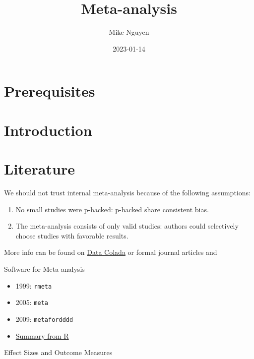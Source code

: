 \documentclass[
]{book}
\title{Meta-analysis}
\author{Mike Nguyen}
\date{2023-01-14}
\providecommand{\tightlist}{%
  \setlength{\itemsep}{0pt}\setlength{\parskip}{0pt}}
\begin{document}
\maketitle

{
\setcounter{tocdepth}{1}
\tableofcontents
}
\hypertarget{prerequisites}{%
\chapter{Prerequisites}\label{prerequisites}}

\hypertarget{intro}{%
\chapter{Introduction}\label{intro}}

\hypertarget{literature}{%
\chapter{Literature}\label{literature}}

We should not trust internal meta-analysis because of the following assumptions:

\begin{enumerate}
\def\labelenumi{\arabic{enumi}.}
\tightlist
\item
  No small studies were p-hacked: p-hacked share consistent bias.
\item
  The meta-analysis consists of only valid studies: authors could selectively choose studies with favorable results.
\end{enumerate}

More info can be found on \href{https://datacolada.org/73}{Data Colada} or formal journal articles \citep{Vosgerau_2019} and \citep{Simmons_2011}

Software for Meta-analysis

\begin{itemize}
\item
  1999: \texttt{rmeta}
\item
  2005: \texttt{meta}
\item
  2009: \texttt{metafordddd}
\item
  \href{https://cran.r-project.org/web/views/MetaAnalysis.html}{Summary from R}
\end{itemize}

Effect Sizes and Outcome Measures
\end{document}
